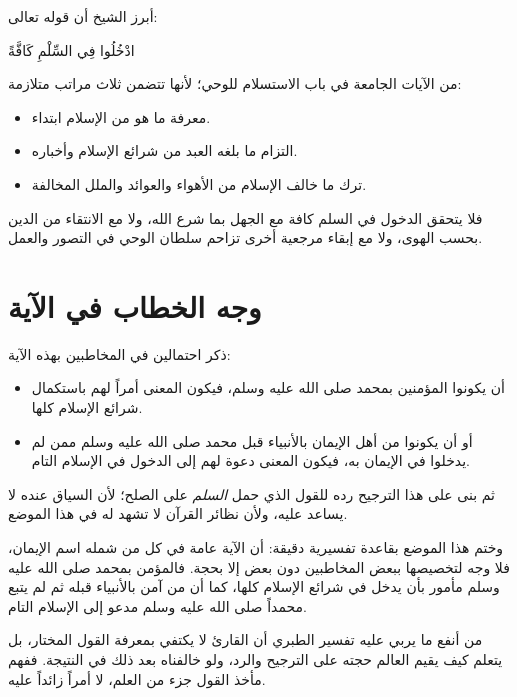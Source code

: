 \begin{fawaid}
أبرز الشيخ أن قوله تعالى: \begin{ayah}ادْخُلُوا فِي السِّلْمِ كَافَّةً\end{ayah} من الآيات الجامعة في باب الاستسلام للوحي؛ لأنها تتضمن ثلاث مراتب متلازمة:
\begin{itemize}
    \item معرفة ما هو من الإسلام ابتداء.
    \item التزام ما بلغه العبد من شرائع الإسلام وأخباره.
    \item ترك ما خالف الإسلام من الأهواء والعوائد والملل المخالفة.
\end{itemize}
فلا يتحقق الدخول في السلم كافة مع الجهل بما شرع الله، ولا مع الانتقاء من الدين بحسب الهوى، ولا مع إبقاء مرجعية أخرى تزاحم سلطان الوحي في التصور والعمل.
\end{fawaid}

\section{وجه الخطاب في الآية}
ذكر  احتمالين في المخاطبين بهذه الآية:
\begin{itemize}
    \item أن يكونوا المؤمنين بمحمد صلى الله عليه وسلم، فيكون المعنى أمراً لهم باستكمال شرائع الإسلام كلها.
    \item أو أن يكونوا من أهل الإيمان بالأنبياء قبل محمد صلى الله عليه وسلم ممن لم يدخلوا في الإيمان به، فيكون المعنى دعوة لهم إلى الدخول في الإسلام التام.
\end{itemize}

ثم بنى على هذا الترجيح رده للقول الذي حمل \textit{السلم} على الصلح؛ لأن السياق عنده لا يساعد عليه، ولأن نظائر القرآن لا تشهد له في هذا الموضع.

وختم  هذا الموضع بقاعدة تفسيرية دقيقة: أن الآية عامة في كل من شمله اسم الإيمان، فلا وجه لتخصيصها ببعض المخاطبين دون بعض إلا بحجة. فالمؤمن بمحمد صلى الله عليه وسلم مأمور بأن يدخل في شرائع الإسلام كلها، كما أن من آمن بالأنبياء قبله ثم لم يتبع محمداً صلى الله عليه وسلم مدعو إلى الإسلام التام.

\begin{fawaid}
من أنفع ما يربي عليه تفسير الطبري أن القارئ لا يكتفي بمعرفة القول المختار، بل يتعلم كيف يقيم العالم حجته على الترجيح والرد، ولو خالفناه بعد ذلك في النتيجة. ففهم مأخذ القول جزء من العلم، لا أمراً زائداً عليه.
\end{fawaid}

